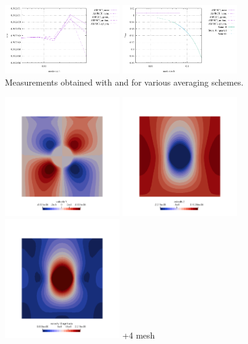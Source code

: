 \begin{center}
\includegraphics[width=5cm]{images/stokes_sphere3D/pressure_mean_OT}
\includegraphics[width=5cm]{images/stokes_sphere3D/pressure_max_OT}\\
{\captionfont Measurements obtained with \aspect and  for various averaging schemes.}
\end{center}


\begin{center}
\includegraphics[width=5cm]{images/stokes_sphere3D/aspect_amr_OT/v}
\includegraphics[width=5cm]{images/stokes_sphere3D/aspect_amr_OT/w}
\includegraphics[width=5cm]{images/stokes_sphere3D/aspect_amr_OT/vel}
{+4 mesh}
\end{center}

